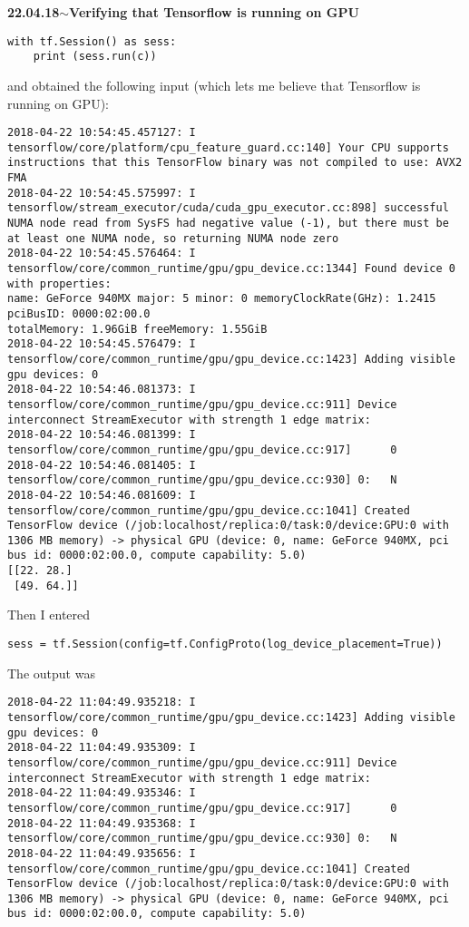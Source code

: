 \documentclass[11pt,a4paper]{article}
\newenvironment{loggentry}[2]%
{\noindent\textbf{#1}\hspace{1cm}$\mathbf{\sim}$\text{ }\textbf{#2}\\}{\vspace{0.5cm}}
\begin{document}
\begin{loggentry}{22.04.18}{Verifying that Tensorflow is running on GPU}
\begin{verbatim}
with tf.Session() as sess:
    print (sess.run(c))
\end{verbatim}
and obtained the following input (which lets me believe that Tensorflow is running on GPU):\\
\begin{verbatim}
2018-04-22 10:54:45.457127: I tensorflow/core/platform/cpu_feature_guard.cc:140] Your CPU supports instructions that this TensorFlow binary was not compiled to use: AVX2 FMA
2018-04-22 10:54:45.575997: I tensorflow/stream_executor/cuda/cuda_gpu_executor.cc:898] successful NUMA node read from SysFS had negative value (-1), but there must be at least one NUMA node, so returning NUMA node zero
2018-04-22 10:54:45.576464: I tensorflow/core/common_runtime/gpu/gpu_device.cc:1344] Found device 0 with properties: 
name: GeForce 940MX major: 5 minor: 0 memoryClockRate(GHz): 1.2415
pciBusID: 0000:02:00.0
totalMemory: 1.96GiB freeMemory: 1.55GiB
2018-04-22 10:54:45.576479: I tensorflow/core/common_runtime/gpu/gpu_device.cc:1423] Adding visible gpu devices: 0
2018-04-22 10:54:46.081373: I tensorflow/core/common_runtime/gpu/gpu_device.cc:911] Device interconnect StreamExecutor with strength 1 edge matrix:
2018-04-22 10:54:46.081399: I tensorflow/core/common_runtime/gpu/gpu_device.cc:917]      0 
2018-04-22 10:54:46.081405: I tensorflow/core/common_runtime/gpu/gpu_device.cc:930] 0:   N 
2018-04-22 10:54:46.081609: I tensorflow/core/common_runtime/gpu/gpu_device.cc:1041] Created TensorFlow device (/job:localhost/replica:0/task:0/device:GPU:0 with 1306 MB memory) -> physical GPU (device: 0, name: GeForce 940MX, pci bus id: 0000:02:00.0, compute capability: 5.0)
[[22. 28.]
 [49. 64.]]
\end{verbatim}
Then I entered
\begin{verbatim}
sess = tf.Session(config=tf.ConfigProto(log_device_placement=True))
\end{verbatim}
The output was
\begin{verbatim}
2018-04-22 11:04:49.935218: I tensorflow/core/common_runtime/gpu/gpu_device.cc:1423] Adding visible gpu devices: 0
2018-04-22 11:04:49.935309: I tensorflow/core/common_runtime/gpu/gpu_device.cc:911] Device interconnect StreamExecutor with strength 1 edge matrix:
2018-04-22 11:04:49.935346: I tensorflow/core/common_runtime/gpu/gpu_device.cc:917]      0 
2018-04-22 11:04:49.935368: I tensorflow/core/common_runtime/gpu/gpu_device.cc:930] 0:   N 
2018-04-22 11:04:49.935656: I tensorflow/core/common_runtime/gpu/gpu_device.cc:1041] Created TensorFlow device (/job:localhost/replica:0/task:0/device:GPU:0 with 1306 MB memory) -> physical GPU (device: 0, name: GeForce 940MX, pci bus id: 0000:02:00.0, compute capability: 5.0)

\end{verbatim}
\end{loggentry}
\end{document}
